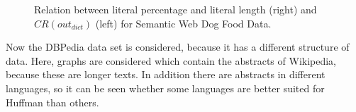 \begin{figure}[h]
	\centering
	\hfill
	\caption{Relation between literal percentage and literal length (right) and $CR(out_{dict})$ (left) for Semantic Web Dog Food Data.}
	\label{fig:dogfood}
\end{figure}

Now the DBPedia data set is considered, because it has a different structure of data. Here, graphs are considered which contain the abstracts of Wikipedia, because these are longer texts. In addition there are abstracts in different languages, so it can be seen whether some languages are better suited for Huffman than others.

